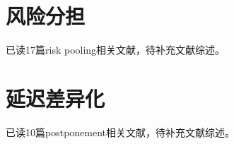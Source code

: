 \section{风险分担}

已读17篇risk pooling相关文献，待补充文献综述。











\section{延迟差异化}

已读10篇postponement相关文献，待补充文献综述。